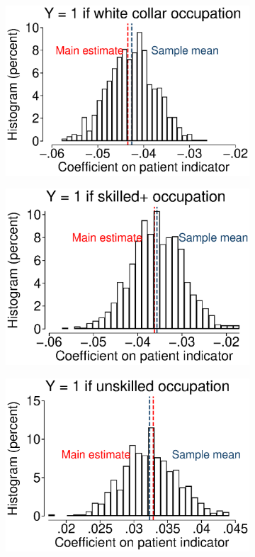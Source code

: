 \documentclass[12pt,english]{article}
\begin{document}
\begin{figure}[!ht]
\begin{subfigure}{0.49\textwidth}
	\includegraphics[width=1.00\linewidth]{../output/02_appendix/figure_a12_panel_03.eps}
\end{subfigure}
\begin{subfigure}{0.49\textwidth}
	\centering
	\includegraphics[width=1.00\linewidth]{../output/02_appendix/figure_a12_panel_04.eps}
\end{subfigure}
\begin{subfigure}{0.49\textwidth}
	\centering
	\includegraphics[width=1.00\linewidth]{../output/02_appendix/figure_a12_panel_05.eps}

\end{subfigure}
\end{figure}
\end{document}
